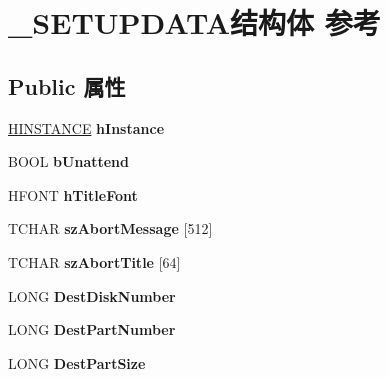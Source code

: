 \hypertarget{struct___s_e_t_u_p_d_a_t_a}{}\section{\+\_\+\+S\+E\+T\+U\+P\+D\+A\+T\+A结构体 参考}
\label{struct___s_e_t_u_p_d_a_t_a}
\subsection*{Public 属性}
\begin{DoxyCompactItemize}
\item 
\mbox{\label{struct___s_e_t_u_p_d_a_t_a_a12a1d8175e786b3cf11f74fc5cf0cb7d}} 
\hyperlink{interfacevoid}{H\+I\+N\+S\+T\+A\+N\+CE} {\bfseries h\+Instance}
\item 
\mbox{\label{struct___s_e_t_u_p_d_a_t_a_afe2ae64638057f7c5af03a424cc3a386}} 
B\+O\+OL {\bfseries b\+Unattend}
\item 
\mbox{\label{struct___s_e_t_u_p_d_a_t_a_a50fabdb08fcfc419c5807e7a9821b5dc}} 
H\+F\+O\+NT {\bfseries h\+Title\+Font}
\item 
\mbox{\label{struct___s_e_t_u_p_d_a_t_a_a765b1e59323e15ce46db2cfa476e8c2e}} 
T\+C\+H\+AR {\bfseries sz\+Abort\+Message} \mbox{[}512\mbox{]}
\item 
\mbox{\label{struct___s_e_t_u_p_d_a_t_a_aff5177e78c030f884116191529c52071}} 
T\+C\+H\+AR {\bfseries sz\+Abort\+Title} \mbox{[}64\mbox{]}
\item 
\mbox{\label{struct___s_e_t_u_p_d_a_t_a_a30b699886c8b2d26bd139f680447f892}} 
L\+O\+NG {\bfseries Dest\+Disk\+Number}
\item 
\mbox{\label{struct___s_e_t_u_p_d_a_t_a_af2d525ade41fda68a48c3ac0e7bce881}} 
L\+O\+NG {\bfseries Dest\+Part\+Number}
\item 
\mbox{\label{struct___s_e_t_u_p_d_a_t_a_a998fd0f95e2f356c388f6c1d9011d51f}} 
L\+O\+NG {\bfseries Dest\+Part\+Size}
\item 

\end{DoxyCompactItemize}
